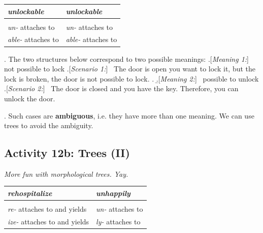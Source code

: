 \documentclass[11pt, oneside]{article}   	%
\begin{document}
\begin{center}
\begin{tabular}{| P{0.4\textwidth} | P{0.4\textwidth} |}\hline
\textit{unlockable}	&	\textit{unlockable} \\ \hline
		&	\\[5cm] \hline
{\itshape un-} attaches to \underline{\hspace{0.5cm}} & {\itshape un-} attaches to \underline{\hspace{0.5cm}} \\
{\itshape able-} attaches to \underline{\hspace{0.5cm}} & {\itshape able-} attaches to \underline{\hspace{0.5cm}} \\ \hline	
\end{tabular}
\end{center}

\ex. The two structures below correspond to two possible meanings:
	\a.[{\itshape Meaning 1:}]~ not possible to lock
		\a.[{\itshape Scenario 1:}]~ The door is open you want to lock it, but the lock is broken, the door is not possible to lock.
		\z.
	\b.[{\itshape Meaning 2:}]~ possible to unlock
		\a.[{\itshape Scenario 2:}]~ The door is closed and you have the key. Therefore, you can unlock the door.
		
\ex. Such cases are {\bfseries ambiguous}, i.e. they have more than one meaning. We can use trees to avoid the ambiguity.

\newpage
		
\subsection{Activity 12b: Trees (II)}

{\itshape More fun with morphological trees. Yay.}

\begin{center}
\begin{tabular}{| P{0.4\textwidth} | P{0.4\textwidth} |}\hline
\textit{rehospitalize}	&	\textit{unhappily} \\ \hline
		&	\\[5cm] \hline
{\itshape re-} attaches to \underline{\hspace{0.5cm}} and yields \underline{\hspace{0.5cm}} & {\itshape un-} attaches to \underline{\hspace{0.5cm}}\\ \hline
{\itshape ize-} attaches to \underline{\hspace{0.5cm}} and yields \underline{\hspace{0.5cm}} & {\itshape ly-} attaches to \underline{\hspace{0.5cm}}\\ \hline
\end{tabular}
\end{center}
\end{document}
